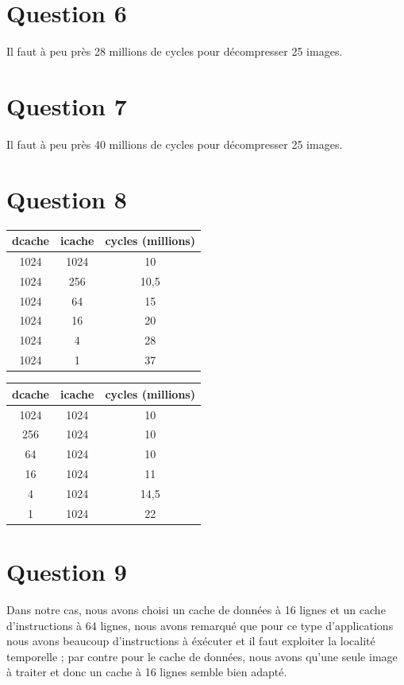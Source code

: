\documentclass[12pt]{article}
\begin{document}
\section*{Question 6}
Il faut à peu près 28 millions de cycles pour décompresser 25 images.
\section*{Question 7}
Il faut à peu près 40 millions de cycles pour décompresser 25 images.
\section*{Question 8}
\begin{tabular}{|c|c|c|}
    \hline
    dcache & icache & cycles (millions) \\
    \hline
    1024 & 1024 & 10 \\
    1024 &  256 & 10,5 \\
    1024 &   64 & 15 \\
    1024 &   16 & 20 \\
    1024 &    4 & 28 \\
    1024 &    1 & 37 \\
    \hline
  \end{tabular}
  \hspace{2cm}
  \begin{tabular}{|c|c|c|}
    \hline
    dcache & icache & cycles (millions) \\
    \hline
    1024 & 1024 & 10 \\
     256 & 1024 & 10 \\
      64 & 1024 & 10 \\
      16 & 1024 & 11 \\
       4 & 1024 & 14,5 \\
       1 & 1024 & 22 \\
    \hline
  \end{tabular}
\section*{Question 9}
Dans notre cas, nous avons choisi un cache de données à 16 lignes et un cache d'instructions à 64 lignes, nous avons remarqué que pour ce type d'applications nous avons beaucoup d'instructions à éxécuter et il faut exploiter la localité temporelle ; par contre pour le cache de données, nous avons qu'une seule image à traiter et donc un cache à 16 lignes semble bien adapté.\\
\end{document}
